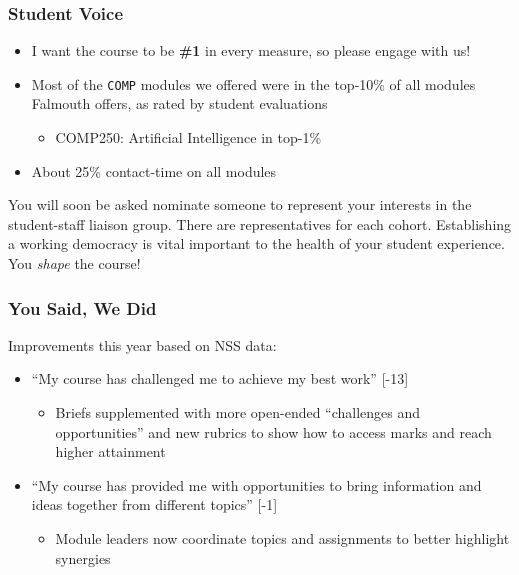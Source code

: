 \begin{frame}
	\frametitle{Student Voice}
			
	\begin{itemize}
		\item I want the course to be \textbf{\#1} in every measure, so please engage with us!
		\item Most of the \texttt{COMP} modules we offered were in the top-10\% of all modules Falmouth offers, as rated by student evaluations 
		\begin{itemize}
			\item COMP250: Artificial Intelligence in top-1\% 
		\end{itemize}	
		\item About 25\% contact-time on all modules
	\end{itemize}
	
	\vspace{1em}
	
	You will soon be asked nominate someone to represent your interests in the student-staff liaison group. There are representatives for each cohort. 
	Establishing a working democracy is vital important to the health of your student experience. You \textit{shape} the course!
	
\end{frame}

\begin{frame}
	\frametitle{You Said, We Did}
	
	Improvements this year based on NSS data: \pause
		
	\begin{itemize}
		\item ``My course has challenged me to achieve my best work'' [-13] 
		\begin{itemize}
			\item Briefs supplemented with more open-ended ``challenges and opportunities'' and new rubrics to show how to access marks and reach higher attainment
		\end{itemize}	
		
		\pause\item ``My course has provided me with opportunities to bring information and ideas together from different topics'' [-1]
		\begin{itemize}
			\item Module leaders now coordinate topics and assignments to better highlight synergies 
		\end{itemize}	
		
	\end{itemize}
\end{frame}

